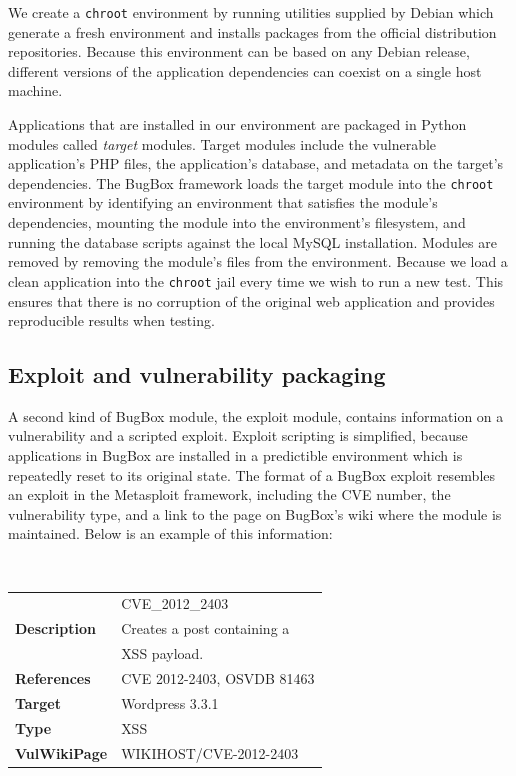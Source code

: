 \documentclass[letterpaper,twocolumn,10pt]{article}
\begin{document}
We create a \texttt{chroot} environment by running utilities supplied by Debian which generate a fresh environment and installs packages from the official distribution repositories. Because this environment can be based on any Debian release, different versions of the application dependencies can coexist on a single host machine. 

Applications that are installed in our environment are packaged in Python modules called \textit{target} modules. Target modules include the vulnerable application's PHP files, the application's database, and metadata on the target's dependencies. The BugBox framework loads the target module into the \texttt{chroot} environment by identifying an environment that satisfies the module's dependencies, mounting the module into the environment's filesystem, and running the database scripts against the local MySQL installation. Modules are removed by removing the module's files from the environment. Because we load a clean application into the {\tt chroot} jail every time we wish to run a new test.  This ensures that there is no corruption of the original web application and provides reproducible results when testing.

\subsection{Exploit and vulnerability packaging}

A second kind of BugBox module, the exploit module, contains information on a vulnerability and a scripted exploit. Exploit scripting is simplified, because applications in BugBox are installed in a predictible environment which is repeatedly reset to its original state. The format of a BugBox exploit resembles an exploit in the Metasploit framework, including the CVE number, the vulnerability type, and a link to the page on BugBox's wiki where the module is maintained. Below is an example of this information:

\begin{minipage}{\textwidth}
{\tt \small
\begin{tabular} { l l }
\noindent{\bf Name}&CVE\_2012\_2403\\
{\bf Description}&Creates a post containing a\\& XSS payload.\\
{\bf References}&CVE 2012-2403, OSVDB 81463 \\
{\bf Target}&Wordpress 3.3.1\\
{\bf Type}&XSS\\
{\bf VulWikiPage}&WIKIHOST/CVE-2012-2403
\end{tabular}
}
\end{minipage}
\end{document}

